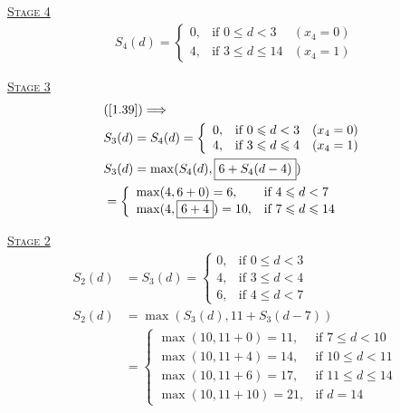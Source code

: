 \uline{\textsc{\textcolor{MarkerColour}{Stage 4}}}
\begin{align*}
    S_4(d) = \left\lbrace\begin{array}{lll}
        0, & \text{if } 0\leqslant d < 3 & (x_4=0)  \\
        \boxed{4}, & \text{if } 3\leqslant d\leqslant 14 & (x_4=1) 
    \end{array} \right.
\end{align*}

\uline{\textsc{\textcolor{MarkerColour}{Stage 3}}}
\begin{align*}
    &(\ref{1.39}) \Longrightarrow \\
    & S_3(d) = S_4(d) = \left\lbrace\begin{array}{lll}
        0, & \text{if } 0\leqslant d < 3 & (x_4=0)  \\
        4, & \text{if } 3\leqslant d\leqslant 4 & (x_4=1) 
    \end{array} \right. \\
    & S_3(d) =\max(S_4(d), \boxed{6+S_4(d-4)})\\
    & = \left\lbrace\begin{array}{ll}
             \max(4, 6+0) = 6, & \text{if } 4\leqslant d<7  \\
             \max(4, \boxed{6+4}) = 10, & \text{if } 7\leqslant d\leqslant 14
    \end{array} \right.
\end{align*}

\uline{\textsc{\textcolor{MarkerColour}{Stage 2}}}
\begin{align*}
    S_2(d) &= S_3(d) = \left\lbrace\begin{array}{ll}
        0, & \text{if } 0\leqslant d< 3\\
        4, &\text{if } 3\leqslant d<4\\
        6, &\text{if } 4\leqslant d < 7
    \end{array} \right. \\
    S_2(d) &= \max(S_3(d), \boxed{11+S_3(d-7)}) \\
    & = \left\lbrace\begin{array}{ll}
        \max(10, 11+0) = 11, & \text{if } 7\leqslant d<10 \\
        \max(10, 11+4) = 14, &\text{if } 10\leqslant d< 11\\
        \max(10, 11+6) = 17, &\text{if } 11\leqslant d\leqslant 14\\
        \max(10, \boxed{11+10}) = 21, &\text{if } d=14
    \end{array} \right.
\end{align*}

